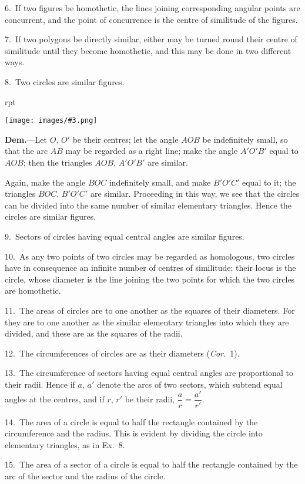 \documentclass[oneside]{book}
\newcounter{wrapwidth}
\newcommand\imgflow[3]{
\setcounter{wrapwidth}{#1}
\begin{wrapfigure}[#2]{r}{\value{wrapwidth}pt}
\begin{center}
\vspace{-0.3in}
\texttt{[image: images/\#3.png]}
\end{center}
\end{wrapfigure}
}
\begin{document}
\smallskip
\begin{footnotesize}
6.~If two figures be homothetic, the lines joining corresponding
angular points are concurrent, and the point of concurrence is the
centre of similitude of the figures.

7.~If two polygons be directly similar, either may be turned
round their centre of similitude until they become homothetic,
and this may be done in two different ways.

8.~Two circles are similar figures.

\imgflow{235}{12}{f201}

\textbf{Dem.}---Let $O$, $O'$ be their centres; let the angle $AOB$ be
indefinitely
small, so that
the arc $AB$
may be regarded
as a
right line;
make the
angle $A'O'B'$
equal to $AOB$;
then the triangles
$AOB$,
$A'O'B'$ are similar.

Again, make the angle $BOC$ indefinitely small, and make $B'O'C'$
equal to it; the triangles $BOC$, $B'O'C'$ are similar. Proceeding
in this way, we see that the circles can be divided into the same
number of similar elementary triangles. Hence the circles are
similar figures.

9.~Sectors of circles having equal central angles are similar
figures.

10.~As any two points of two circles may be regarded as homologous,
two circles have in consequence an infinite number of
centres of similitude; their locus is the circle, whose diameter is
the line joining the two points for which the two circles are
homothetic.

11.~The areas of circles are to one another as the squares of
their diameters. For they are to one another as the similar
elementary triangles into which they are divided, and these are
as the squares of the radii.

12.~The circumferences of circles are as their diameters
(\textit{Cor.}~1).

13.~The circumference of sectors having equal central angles
are proportional to their radii. Hence if $a$, $a'$ denote the arcs of
two sectors, which subtend equal angles at the centres, and if
$r$, $r'$ be their radii, $\dfrac{a}{r} = \dfrac{a'}{r'}$.

14.~The area of a circle is equal to half the rectangle contained
by the circumference and the radius. This is evident by
dividing the circle into elementary triangles, as in Ex.~8.

15.~The area of a sector of a circle is equal to half the rectangle
contained by the arc of the sector and the radius of the
circle.
\par\end{footnotesize}
\end{document}
